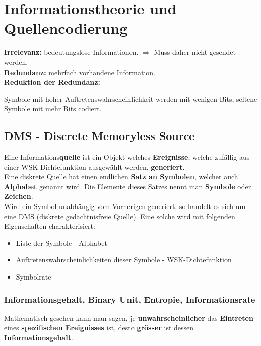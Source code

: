 \section{Informationstheorie und Quellencodierung }
\textbf{Irrelevanz:} bedeutungslose Informationen. $\Rightarrow$ Muss daher nicht gesendet werden. \\
\textbf{Redundanz:} mehrfach vorhandene Information. \\
\textbf{Reduktion der Redundanz:} \parbox[t]{14cm}{Symbole mit hoher Auftretenswahrscheinlichkeit werden mit wenigen Bits, seltene Symbole mit mehr Bits codiert.}
\subsection{DMS - Discrete Memoryless Source }
Eine Informations\textbf{quelle} ist ein Objekt welches \textbf{Ereignisse}, welche zufällig aus einer
WSK-Dichtefunktion ausgewählt werden, \textbf{generiert}. \\ 
Eine diskrete Quelle hat einen endlichen \textbf{Satz an Symbolen}, welcher auch \textbf{Alphabet}
genannt wird. Die Elemente dieses Satzes nennt man \textbf{Symbole} oder \textbf{Zeichen}. \\
Wird ein Symbol unabhängig vom Vorherigen generiert, so handelt es sich um eine DMS (diskrete
gedächtnisfreie Quelle). Eine solche wird mit folgenden Eigenschaften charakterisiert:
\begin{itemize}\addtolength{\itemsep}{-0.3\baselineskip}
  \item Liste der Symbole - Alphabet
  \item Auftretenswahrscheinlichkeiten dieser Symbole - WSK-Dichtefunktion
  \item Symbolrate 
\end{itemize} 

\subsubsection{Informationsgehalt, Binary Unit, Entropie, Informationsrate }
Mathematisch gesehen kann man sagen, je \textbf{unwahrscheinlicher} das \textbf{Eintreten} eines \textbf{spezifischen
Ereignisses} ist, desto \textbf{grösser} ist dessen \textbf{Informationsgehalt}.

